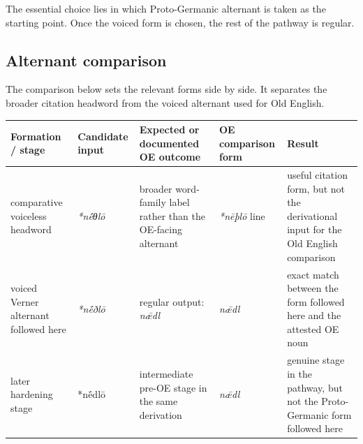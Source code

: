 \documentclass[
  british,
  a4paper,
  openany]{book}
\newcounter{none} %
\begin{document}
The essential choice lies in which Proto-Germanic alternant is taken as
the starting point. Once the voiced form is chosen, the rest of the
pathway is regular.

\subsection{Alternant comparison}\label{alternant-comparison}

The comparison below sets the relevant forms side by side. It separates
the broader citation headword from the voiced alternant used for Old
English.

{\def\LTcaptype{none} %
\begin{longtable}[]{@{}
  >{\raggedright\arraybackslash}p{}
  >{\raggedright\arraybackslash}p{}
  >{\raggedright\arraybackslash}p{}
  >{\raggedright\arraybackslash}p{}
  >{\raggedright\arraybackslash}p{}@{}}
\toprule\noalign{}
\begin{minipage}[b]{\linewidth}\raggedright
Formation / stage
\end{minipage} & \begin{minipage}[b]{\linewidth}\raggedright
Candidate input
\end{minipage} & \begin{minipage}[b]{\linewidth}\raggedright
Expected or documented OE outcome
\end{minipage} & \begin{minipage}[b]{\linewidth}\raggedright
OE comparison form
\end{minipage} & \begin{minipage}[b]{\linewidth}\raggedright
Result
\end{minipage} \\
\midrule\noalign{}
\endhead
\bottomrule\noalign{}
\endlastfoot
comparative voiceless headword & {\emph{*nḗθlō}} & broader word-family
label rather than the OE-facing alternant & \emph{*nēþlō} line & useful
citation form, but not the derivational input for the Old English
comparison \\
voiced Verner alternant followed here & {\emph{*nḗðlō}} & regular
output: {\emph{nǣdl}} & {\emph{nǣdl}} & exact match between the form
followed here and the attested OE noun \\
later hardening stage & *nḗdlō & intermediate pre-OE stage in the same
derivation & \emph{nǣdl} & genuine stage in the pathway, but not the
Proto-Germanic form followed here \\
\end{longtable}
}
\end{document}
